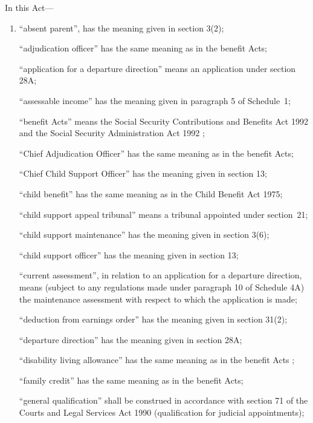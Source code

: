 \documentclass[12pt,a4paper]{article}
\begin{document}
In this Act—
\begin{enumerate}\item[]
    “absent parent”, has the meaning given in section 3(2);

    “adjudication officer” has the same meaning as in the benefit Acts;

“application for a departure direction” means an application under section 28A;

    “assessable income” has the meaning given in paragraph 5 of Schedule~1;

    “benefit Acts” means the 
Social Security Contributions and Benefits Act 1992 and the Social Security Administration Act 1992%
;

    “Chief Adjudication Officer” has the same meaning as in the benefit Acts;

    “Chief Child Support Officer” has the meaning given in section 13;

    “child benefit” has the same meaning as in the Child Benefit Act 1975;

    “child support appeal tribunal” means a tribunal appointed under section~21;

    “child support maintenance” has the meaning given in section 3(6);

    “child support officer” has the meaning given in section 13;

“current assessment”, in relation to an application for a departure direction, means (subject to any regulations made under paragraph 10 of Schedule 4A) the maintenance assessment with respect to which the application is made;

    “deduction from earnings order” has the meaning given in section 31(2);

“departure direction” has the meaning given in section 28A;

    “disability living allowance” has the same meaning as in the 
benefit Acts%
;

    “family credit” has the same meaning as in the benefit Acts;

    “general qualification” shall be construed in accordance with section 71 of the Courts and Legal Services Act 1990 (qualification for judicial appointments);


\end{enumerate}
\end{document}

